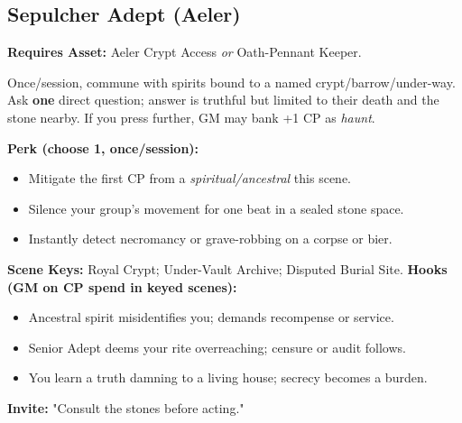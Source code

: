 \subsection{Sepulcher Adept (Aeler)}
\textbf{Requires Asset:} Aeler Crypt Access \emph{or} Oath-Pennant Keeper.
\begin{tcolorbox}[enhanced,sharp corners,boxrule=.6pt,title={Talent — Whisper of the Unquiet Dead (6 XP)}]
Once/session, commune with spirits bound to a named crypt/barrow/under-way. Ask \textbf{one} direct question; answer is truthful but limited to their death and the stone nearby. If you press further, GM may bank +1 CP as \emph{haunt}.
\end{tcolorbox}
\textbf{Perk (choose 1, once/session):}
\begin{itemize}
  \item Mitigate the first CP from a \emph{spiritual/ancestral} \SuitClub{} this scene.
  \item Silence your group's movement for one beat in a sealed stone space.
  \item Instantly detect necromancy or grave-robbing on a corpse or bier.
\end{itemize}
\textbf{Scene Keys:} Royal Crypt; Under-Vault Archive; Disputed Burial Site.
\textbf{Hooks (GM on CP spend in keyed scenes):}
\begin{itemize}
  \item Ancestral spirit misidentifies you; demands recompense or service.
  \item Senior Adept deems your rite overreaching; censure or audit follows.
  \item You learn a truth damning to a living house; secrecy becomes a burden.
\end{itemize}
\textbf{Invite:} "Consult the stones before acting."

